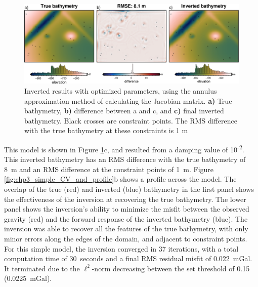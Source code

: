 \begin{figure}[!ht]
    \centering
    \includegraphics[width=.95\textwidth]{figures/chp3/chp3_simple_results.png}
    \caption[Annulus approximation inversion results]{Inverted results with optimized parameters, using the annulus approximation method of calculating the Jacobian matrix. \textbf{a)} True bathymetry, \textbf{b)} difference between a and c, and \textbf{c)} final inverted bathymetry. Black crosses are constraint points. The RMS difference with the true bathymetry at these constraints is 1 m}
    \label{fig:chp3_simple_results}
\end{figure}

This model is shown in Figure \ref{fig:chp3_simple_results}c, and resulted from a damping value of 10\textsuperscript{-2}. This inverted bathymetry has an RMS difference with the true bathymetry of 8~m and an RMS difference at the constraint points of 1~m. Figure \ref{fig:chp3_simple_CV_and_profile}b shows a profile across the model. The overlap of the true (red) and inverted (blue) bathymetry in the first panel shows the effectiveness of the inversion at recovering the true bathymetry. The lower panel shows the inversion's ability to minimize the misfit between the observed gravity (red) and the forward response of the inverted bathymetry (blue). The inversion was able to recover all the features of the true bathymetry, with only minor errors along the edges of the domain, and adjacent to constraint points. For this simple model, the inversion converged in 37 iterations, with a total computation time of 30~seconds and a final RMS residual misfit of 0.022~mGal. It terminated due to the $\ell^2$-norm decreasing between the set threshold of 0.15 (0.0225~mGal).

